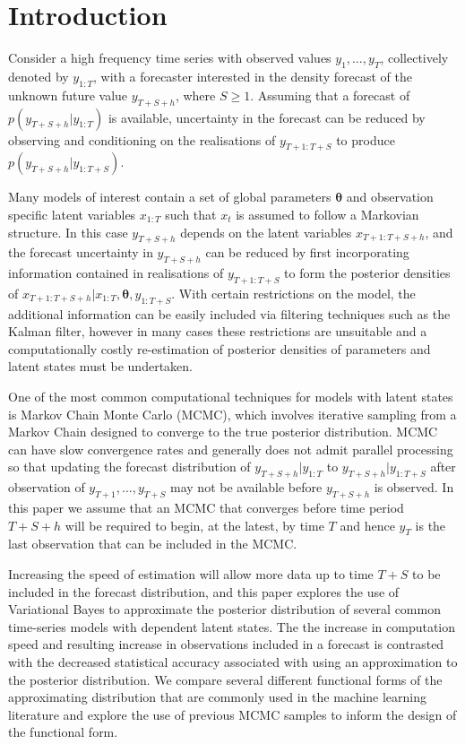 \documentclass[12pt,a4paper]{article}%
\numberwithin{equation}{section}
\begin{document}
\section{Introduction}
\label{Intro}

Consider a high frequency time series with observed values $y_{1}, \dots, y_{T}$, collectively denoted by $y_{1:T}$, with a forecaster interested in the density forecast of the unknown future value $y_{T+S+h}$, where $S \geq 1$. Assuming that a forecast of $p(y_{T+S+h} | y_{1:T})$ is available, uncertainty in the forecast can be reduced by observing and conditioning on the realisations of $y_{T+1:T+S}$ to produce $p(y_{T+S+h} | y_{1:T+S})$. 

Many models of interest contain a set of global parameters $\boldsymbol{\theta}$ and observation specific latent variables $x_{1:T}$ such that $x_t$ is assumed to follow a Markovian structure. In this case $y_{T+S+h}$ depends on the latent variables $x_{T+1:T+S+h}$, and the forecast uncertainty in $y_{T+S+h}$ can be reduced by first incorporating information contained in realisations of $y_{T+1:T+S}$ to form the posterior densities of $x_{T+1:T+S+h} | x_{1:T}, \boldsymbol{\theta}, y_{1:T+S}$. With certain restrictions on the model, the additional information can be easily included via filtering techniques such as the Kalman filter, however in many cases these restrictions are unsuitable and a computationally costly re-estimation of posterior densities of parameters and latent states must be undertaken.

One of the most common computational techniques for models with latent states is Markov Chain Monte Carlo (MCMC), which involves iterative sampling from a Markov Chain designed to converge to the true posterior distribution. MCMC can have slow convergence rates and generally does not admit parallel processing so that updating the forecast distribution of $y_{T+S+h} | y_{1:T}$ to $y_{T+S+h} | y_{1:T+S}$ after observation of $y_{T+1}, \dots, y_{T+S}$ may not be available before $y_{T+S+h}$ is observed. In this paper we assume that an MCMC that converges before time period $T + S + h$ will be required to begin, at the latest, by time $T$ and hence $y_{T}$ is the last observation that can be included in the MCMC. 

Increasing the speed of estimation will allow more data up to time $T + S$ to be included in the forecast distribution, and this paper explores the use of Variational Bayes to approximate the posterior distribution of several common time-series models with dependent latent states. The the increase in computation speed and resulting increase in observations included in a forecast is contrasted with the decreased statistical accuracy associated with using an approximation to the posterior distribution. We compare several different functional forms of the approximating distribution that are commonly used in the machine learning literature and explore the use of previous MCMC samples to inform the design of the functional form.
\end{document}
